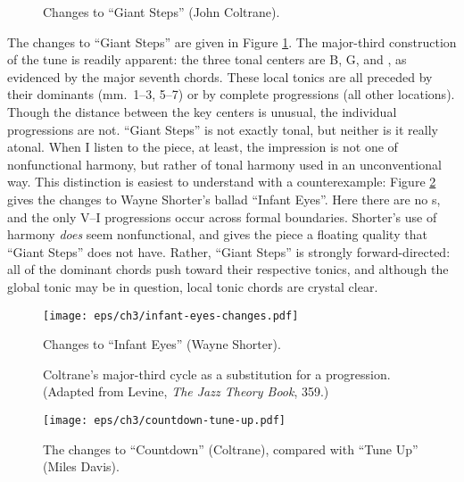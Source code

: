 \begin{figure}[tbp]
  \caption{Changes to ``Giant Steps'' (John Coltrane).}
  \label{maj3:giant-steps-changes}
\end{figure}

The changes to ``Giant Steps'' are given in Figure
\ref{maj3:giant-steps-changes}. The major-third construction of the tune is
readily apparent: the three tonal centers are B, G, and \Eflat, as evidenced
by the major seventh chords. These local tonics are all preceded by their
dominants (mm.~1--3, 5--7) or by complete \tf progressions (all other
locations). Though the distance between the key centers is unusual, the
individual progressions are not. ``Giant Steps'' is not exactly
tonal, but neither is it really atonal. When I listen to the piece, at least,
the impression is not one of nonfunctional harmony, but rather of
tonal harmony used in an unconventional way. This distinction is easiest to understand
with a counterexample: Figure \ref{maj3:infant-eyes-changes} gives the changes to
Wayne Shorter's ballad ``Infant Eyes''. Here there are no \tf{}s,
and the only V--I progressions occur across formal boundaries. Shorter's use
of harmony \emph{does} seem nonfunctional, and gives the piece a floating
quality that ``Giant Steps'' does not have. Rather, ``Giant Steps'' is
strongly forward-directed: all of the dominant chords push toward their
respective tonics, and although the global tonic may be in question, local
tonic chords are crystal clear.

\begin{figure}[tbp]
  \hspace{6em}\texttt{[image: eps/ch3/infant-eyes-changes.pdf]}
  \caption{Changes to ``Infant Eyes'' (Wayne Shorter).}
  \label{maj3:infant-eyes-changes}
\end{figure}

\begin{figure}[tbp]
  \caption[Coltrane's major-third cycle as a substitution for a \tfo
    progression.]{Coltrane's major-third cycle as a substitution for a \tfo
    progression. (Adapted from Levine, \emph{The Jazz Theory Book}, 359.)}
  \label{maj3:coltrane-substitution}
\end{figure}

\begin{figure}[tbp]
  \hspace{1em}\texttt{[image: eps/ch3/countdown-tune-up.pdf]}
  \caption{The changes to ``Countdown'' (Coltrane), compared with
    ``Tune Up'' (Miles Davis).}
  \label{maj3:countdown-tune-up}
\end{figure}

